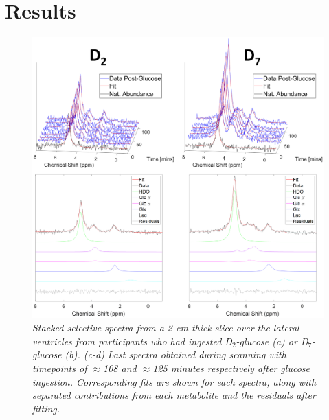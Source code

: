 \section{Results}

\begin{figure}
    \centering
    \includegraphics[width = 1\textwidth]{Figures/Glucose/Selective.png}
    \caption{\textit{Stacked selective spectra from a 2-cm-thick slice over the lateral ventricles from participants who had ingested D$_2$-glucose (a) or D$_7$-glucose (b). (c-d) Last spectra obtained during scanning with timepoints of $\approx$108 and $\approx$125 minutes respectively after glucose ingestion. Corresponding fits are shown for each spectra, along with separated contributions from each metabolite and the residuals after fitting.}}
    \label{fig:Glu:Select}
\end{figure}

